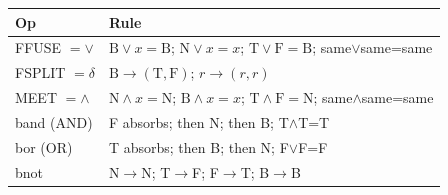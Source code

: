 \documentclass[12pt,a4paper]{article}
\begin{document}
\begin{longtable}[]{@{}ll@{}}
\toprule
\begin{minipage}[b]{0.47\columnwidth}\raggedright
Op\strut
\end{minipage} & \begin{minipage}[b]{0.47\columnwidth}\raggedright
Rule\strut
\end{minipage}\tabularnewline
\midrule
\endhead
\begin{minipage}[t]{0.47\columnwidth}\raggedright
FFUSE \(= \vee\)\strut
\end{minipage} & \begin{minipage}[t]{0.47\columnwidth}\raggedright
\(\mathrm{B}\vee x=\mathrm{B}\); \(\mathrm{N}\vee x=x\);
\(\mathrm{T}\vee\mathrm{F}=\mathrm{B}\); same\(\vee\)same=same\strut
\end{minipage}\tabularnewline
\begin{minipage}[t]{0.47\columnwidth}\raggedright
FSPLIT \(= \delta\)\strut
\end{minipage} & \begin{minipage}[t]{0.47\columnwidth}\raggedright
\(\mathrm{B}\to(\mathrm{T},\mathrm{F})\); \(r\to(r,r)\)\strut
\end{minipage}\tabularnewline
\begin{minipage}[t]{0.47\columnwidth}\raggedright
MEET \(= \wedge\)\strut
\end{minipage} & \begin{minipage}[t]{0.47\columnwidth}\raggedright
\(\mathrm{N}\wedge x=\mathrm{N}\); \(\mathrm{B}\wedge x=x\);
\(\mathrm{T}\wedge\mathrm{F}=\mathrm{N}\); same\(\wedge\)same=same\strut
\end{minipage}\tabularnewline
\begin{minipage}[t]{0.47\columnwidth}\raggedright
band (AND)\strut
\end{minipage} & \begin{minipage}[t]{0.47\columnwidth}\raggedright
F absorbs; then N; then B; T\(\wedge\)T=T\strut
\end{minipage}\tabularnewline
\begin{minipage}[t]{0.47\columnwidth}\raggedright
bor (OR)\strut
\end{minipage} & \begin{minipage}[t]{0.47\columnwidth}\raggedright
T absorbs; then B; then N; F\(\vee\)F=F\strut
\end{minipage}\tabularnewline
\begin{minipage}[t]{0.47\columnwidth}\raggedright
bnot\strut
\end{minipage} & \begin{minipage}[t]{0.47\columnwidth}\raggedright
N\(\to\)N; T\(\to\)F; F\(\to\)T; B\(\to\)B\strut
\end{minipage}\tabularnewline
\bottomrule
\end{longtable}
\end{document}
